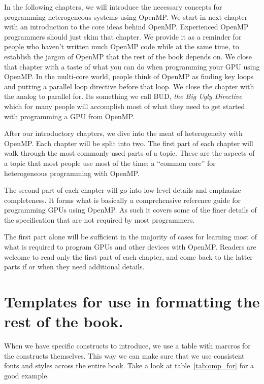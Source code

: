 In the following chapters, we will introduce the necessary concepts for programming heterogeneous systems using OpenMP.
We start in next chapter with an introduction to the core ideas behind OpenMP.  
Experienced OpenMP programmers should just skim that chapter.  We provide 
it as a reminder for people who haven't written much OpenMP code while at the
same time, to establish the jargon of OpenMP that the rest of the book depends on.  We close that chapter with
a taste of what you can do when programming your GPU using OpenMP.   In the multi-core world, people think of OpenMP
as finding key loops and putting a parallel loop directive before that loop.  We close the chapter with the analog to parallel for.  
Its something we call BUD, \emph{the Big Ugly Directive} which for many people will accomplish most of what they need to get started
with programming a GPU from OpenMP.

After our introductory chapters, we dive into the meat of heterogeneity with OpenMP.  
Each chapter will be split into two.
The first part of each chapter will walk through the most commonly used parts of a topic.  These are
the aspects of a topic that most people use most of the time; a ``common core'' for heterogeneous 
programming with OpenMP.

The second part of  each chapter will go into low level details and emphasize completeness.   
It forms what is basically a comprehensive reference guide for programming GPUs using OpenMP.
As such it covers some of the finer details of the specification that are not required by most programmers.

The first part alone will be sufficient in the majority of cases for learning most of what is required to 
program GPUs and other devices with OpenMP. Readers are welcome to read only the first part of 
each chapter, and come back to the latter parts if or when they need additional details.


\section{Templates for use in formatting the rest of the book.}


When we have specific constructs to introduce, we use a table with marcros for the constructs themselves.  This way we can make 
sure that we use consistent fonts and styles across the entire book.  Take a look at table~\ref{tab:omp_for} for a good example.

